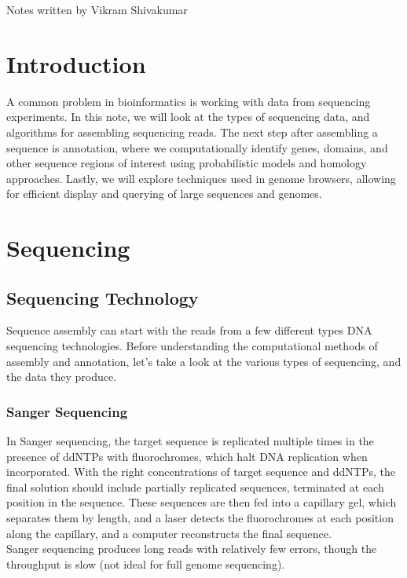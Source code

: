 \documentclass[12pt]{article}
\begin{document}
\thispagestyle{plain}
   \newpage
   \setcounter{page}{1}
   \noindent
   \begin{center}
   \end{center}
   {Notes written by Vikram Shivakumar}
   \vspace*{4mm}


\section{Introduction}
A common problem in bioinformatics is working with data from sequencing experiments. In this note, we will look at the types of sequencing data, and algorithms for assembling sequencing reads. The next step after assembling a sequence is annotation, where we computationally identify genes, domains, and other sequence regions of interest using probabilistic models and homology approaches. Lastly, we will explore techniques used in genome browsers, allowing for efficient display and querying of large sequences and genomes.
\section{Sequencing}
\subsection{Sequencing Technology}
Sequence assembly can start with the reads from a few different types DNA sequencing technologies. Before understanding the computational methods of assembly and annotation, let's take a look at the various types of sequencing, and the data they produce.
\subsubsection{Sanger Sequencing}
In Sanger sequencing, the target sequence is replicated multiple times in the presence of ddNTPs with fluorochromes, which halt DNA replication when incorporated. With the right concentrations of target sequence and ddNTPs, the final solution should include partially replicated sequences, terminated at each position in the sequence. These sequences are then fed into a capillary gel, which separates them by length, and a laser detects the fluorochromes at each position along the capillary, and a computer reconstructs the final sequence.\\[10pt]
Sanger sequencing produces long reads with relatively few errors, though the throughput is slow (not ideal for full genome sequencing).
\end{document}
